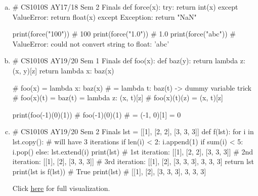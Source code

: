 \begin{enumerate}[(a)]
\item
\begin{python}
# CS1010S AY17/18 Sem 2 Finals
def force(x):
    try:
        return int(x)
    except ValueError:
        return float(x)
    except Exception:
        return "NaN"

print(force("100")) # 100
print(force("1.0")) # 1.0
print(force("abc")) # ValueError: could not convert string to float: 'abc'
\end{python}

\item
\begin{python}
# CS1010S AY19/20 Sem 1 Finals
def foo(x):
    def baz(y):
        return lambda z: (x, y)[z]
    return lambda x: baz(x)

# foo(x) = lambda x: baz(x)
#        = lambda t: baz(t) -> dummy variable trick
# foo(x)(t) = baz(t) = lambda z: (x, t)[z]
# foo(x)(t)(z) = (x, t)[z]

print(foo(-1)(0)(1))
# foo(-1)(0)(1)
# = (-1, 0)[1] = 0
\end{python}

\item
\begin{python}
# CS1010S AY19/20 Sem 2 Finals
lst = [[1], [2, 2], [3, 3, 3]]
def f(lst):
    for i in lst.copy(): # will have 3 iterations
        if len(i) < 2:
            i.append(1)
        if sum(i) < 5:
            i.pop()
        else:
            lst.extend(i)
        print(lst)  # 1st iteration: [[1], [2, 2], [3, 3, 3]]
                    # 2nd iteration: [[1], [2], [3, 3, 3]]
                    # 3rd iteration: [[1], [2], [3, 3, 3], 3, 3, 3]
    return lst
print(lst is f(lst))    # True
print(lst)              # [[1], [2], [3, 3, 3], 3, 3, 3]
\end{python}
Click \href{https://pythontutor.com/visualize.html#code=lst%20%3D%20%5B%5B1%5D,%20%5B2,%202%5D,%20%5B3,%203,%203%5D%5D%0A%0Adef%20f%28lst%29%3A%0A%20%20%20%20for%20i%20in%20lst.copy%28%29%3A%0A%20%20%20%20%20%20%20%20if%20len%28i%29%20%3C%202%3A%0A%20%20%20%20%20%20%20%20%20%20%20%20i.append%281%29%0A%20%20%20%20%20%20%20%20if%20sum%28i%29%20%3C%205%3A%0A%20%20%20%20%20%20%20%20%20%20%20%20i.pop%28%29%0A%20%20%20%20%20%20%20%20else%3A%0A%20%20%20%20%20%20%20%20%20%20%20%20lst.extend%28i%29%0A%20%20%20%20%20%20%20%20print%28lst%29%0A%20%20%20%20return%20lst%0A%0Aprint%28lst%20is%20f%28lst%29%29%0Aprint%28lst%29&cumulative=false&curInstr=0&heapPrimitives=nevernest&mode=display&origin=opt-frontend.js&py=3&rawInputLstJSON=%5B%5D&textReferences=false}{\underline{here}} for full visualization.


\end{enumerate}
